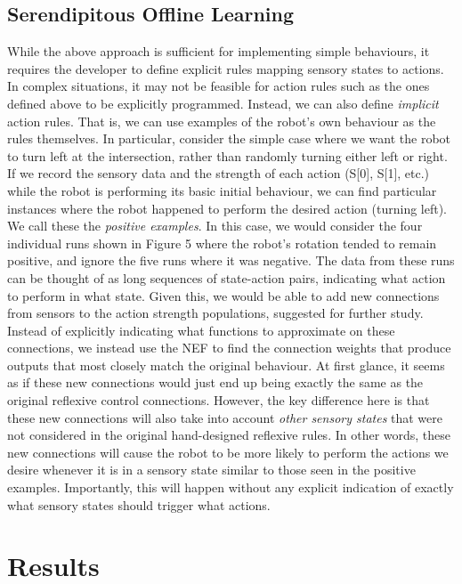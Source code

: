 \documentclass[conference]{IEEEtran}
\begin{document}
\subsection{Serendipitous Offline Learning}

While the above approach is sufficient for implementing
simple behaviours, it requires the developer to define explicit
rules mapping sensory states to actions. In complex
situations, it may not be feasible for action rules such as the
ones defined above to be explicitly programmed. Instead,
we can also define \textit{implicit} action rules. That is, we can use
examples of the robot's own behaviour as the rules
themselves.
In particular, consider the simple case where we want the
robot to turn left at the intersection, rather than randomly
turning either left or right. If we record the sensory data
and the strength of each action (S[0], S[1], etc.) while the
robot is performing its basic initial behaviour, we can find
particular instances where the robot happened to perform
the desired action (turning left). We call these the \textit{positive examples}. In this case, we would consider the four
individual runs shown in Figure 5 where the robot's rotation
tended to remain positive, and ignore the five runs where it
was negative.
The data from these runs can be thought of as long
sequences of state-action pairs, indicating what action to
perform in what state. Given this, we would be able to add new
connections from sensors to the action strength populations, suggested for further study.
Instead of explicitly indicating what functions to
approximate on these connections, we instead use the NEF
to find the connection weights that produce outputs that
most closely match the original behaviour.
At first glance, it seems as if these new connections
would just end up being exactly the same as the original
reflexive control connections. However, the key difference
here is that these new connections will also take into
account \textit{other sensory states} that were not considered in the
original hand-designed reflexive rules. In other words,
these new connections will cause the robot to be more likely
to perform the actions we desire whenever it is in a sensory
state similar to those seen in the positive examples.
Importantly, this will happen without any explicit indication
of exactly what sensory states should trigger what actions.

\section{Results}
\end{document}
